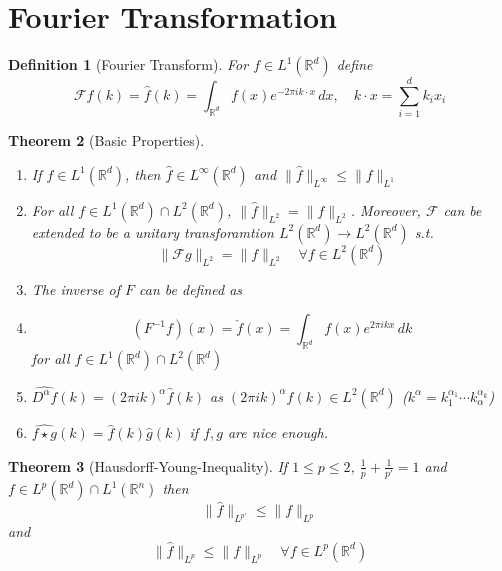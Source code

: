 \documentclass{report}
\theoremstyle{tommy}
\newtheorem{defn}{Definition}
\newtheorem{thm}[defn]{Theorem}
\newcommand{\four}{\mathcal{F}}
\begin{document}
  \section{Fourier Transformation}
  \begin{defn}[Fourier Transform]
    For \(f \in L^1(\mathbb{R}^d)\) define
    \[\four f(k) = \hat f(k) = \int_{\mathbb{R}^d} f(x) e^{- 2 \pi i k \cdot x} \, dx, \quad k\cdot x = \sum_{i=1}^d k_i x_i\]
  \end{defn}

  
  \begin{thm}[Basic Properties]
    \begin{enumerate}
      \item If \(f \in L^1(\mathbb{R}^d)\), then \(\hat f \in L^\infty(\mathbb{R}^d)\) and \(\| \hat f \|_{L^\infty} \le \|f\|_{L^1}\)
      \item For all \(f \in L^1(\mathbb{R}^d) \cap L^2(\mathbb{R}^d)\), \(\|\hat f\|_{L^2} = \|f\|_{L^2}\). Moreover, \(\four\) can be extended to be a unitary transforamtion \(L^2(\mathbb{R}^d) \to L^2(\mathbb{R}^d)\) s.t.
      \[\|\four g\|_{L^2} = \|f\|_{L^2} \quad \forall f \in L^2(\mathbb{R}^d)\]
      \item The inverse of \(F\) can be defined as
      \item \[(F^{-1}f)(x) = \check f (x) = \int_{\mathbb{R}^d} f(x) e^{2 \pi ik x} \, dk\] for all \(f \in L^1(\mathbb{R}^d) \cap L^2(\mathbb{R}^d)\)
      \item \(\widehat{D^\alpha f}(k) = (2 \pi i k)^\alpha \hat f(k)\) as \((2 \pi ik)^\alpha f(k) \in L^2(\mathbb{R}^d)\) (\(k^\alpha = k_1^{\alpha_1} \cdots k_\alpha^{\alpha_k}\))
      \item \(\widehat{f \star g}(k) = \hat f(k) \hat g (k)\) if \(f,g\) are nice enough.
    \end{enumerate}
  \end{thm}

  \begin{thm}[Hausdorff-Young-Inequality]\label{hausdorff-young}
    If \(1 \le p \le 2\), \(\frac{1}{p} + \frac{1}{p'} = 1\) and \(f \in L^p(\mathbb{R}^d) \cap L^1(\mathbb{R}^n)\) then
    \[\| \hat f \|_{L^{p'}} \le \|f\|_{L^p}\]
    and 
    \[\|\hat f\|_{L^p} \le \|f\|_{L^p} \quad \forall f \in L^p(\mathbb{R}^d)\]
  \end{thm}
  
\end{document}
